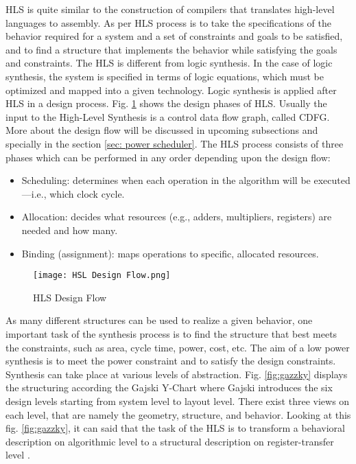 \documentclass[conference]{IEEEtran}
\begin{document}
HLS is quite similar to the construction of compilers that translates high-level languages to assembly. As per \cite{52214} HLS process is to take the specifications of the behavior required for a system and a set of constraints and goals to be satisfied, and to find a structure that implements the behavior while satisfying the goals and constraints. The HLS is different from logic synthesis. In the case of logic synthesis, the system is specified in terms of logic equations, which must be optimized and mapped into a given technology. Logic synthesis is applied after HLS in a design process.
Fig. \ref{fig:HLS Design Flow} shows the design phases of HLS. Usually the input to the High-Level Synthesis is a control data flow graph, called CDFG. More about the design flow will be discussed in upcoming subsections and specially in the section \ref{sec: power scheduler}. The HLS process consists of three phases which can be performed in any order depending upon the design flow: 
\begin{itemize}
    \item Scheduling: determines when each operation in the algorithm will be executed—i.e., which clock cycle.
    \item Allocation: decides what resources (e.g., adders, multipliers, registers) are needed and how many.
    \item Binding (assignment): maps operations to specific, allocated resources.
\end{itemize}

\begin{figure}[h!]
    \centering
    \texttt{[image: HSL Design Flow.png]}
    \caption{HLS Design Flow}
    \label{fig:HLS Design Flow}
\end{figure}


As many different structures can be used to realize a given behavior, one important task of the synthesis process is to find the structure that best meets the constraints, such as area, cycle time, power, cost, etc. The aim of a low power synthesis is to meet the power constraint and to satisfy the design constraints. Synthesis can take place at various levels of abstraction. Fig. \ref{fig:gazzky} displays the structuring according the Gajski Y-Chart where Gajski introduces the six design levels starting from system level to layout level. There exist three views on each level, that are namely the geometry, structure, and behavior. Looking at this fig. \ref{fig:gazzky}, it can said that the task of the HLS is to transform a behavioral description on algorithmic level to a structural description on register-transfer level \cite{DDG92}.
\end{document}
